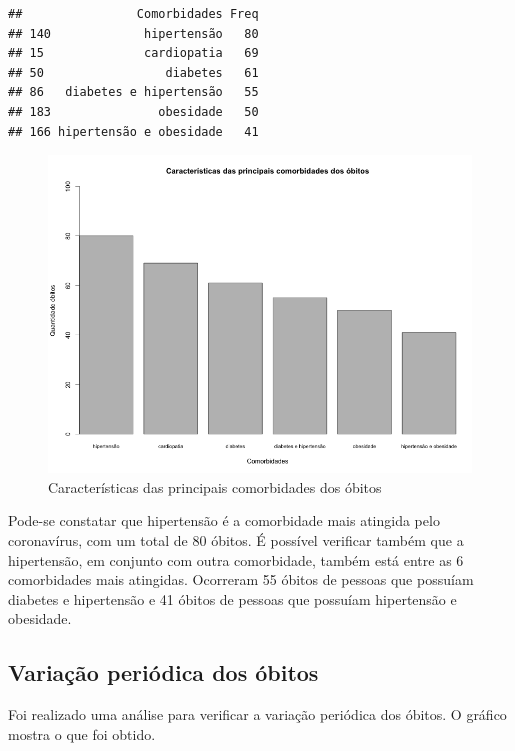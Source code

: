 \documentclass[
]{article}
\begin{document}
\begin{verbatim}
##                Comorbidades Freq
## 140             hipertensão   80
## 15              cardiopatia   69
## 50                 diabetes   61
## 86   diabetes e hipertensão   55
## 183               obesidade   50
## 166 hipertensão e obesidade   41
\end{verbatim}

\begin{figure}
\centering
\includegraphics{../graficos/caracteristicas_principais_comorbidades_obitos.png}
\caption{Características das principais comorbidades dos óbitos}
\end{figure}

Pode-se constatar que hipertensão é a comorbidade mais atingida pelo
coronavírus, com um total de 80 óbitos. É possível verificar também que
a hipertensão, em conjunto com outra comorbidade, também está entre as 6
comorbidades mais atingidas. Ocorreram 55 óbitos de pessoas que possuíam
diabetes e hipertensão e 41 óbitos de pessoas que possuíam hipertensão e
obesidade.

\hypertarget{variauxe7uxe3o-periuxf3dica-dos-uxf3bitos}{%
\subsection{Variação periódica dos
óbitos}\label{variauxe7uxe3o-periuxf3dica-dos-uxf3bitos}}

Foi realizado uma análise para verificar a variação periódica dos
óbitos. O gráfico mostra o que foi obtido.
\end{document}
